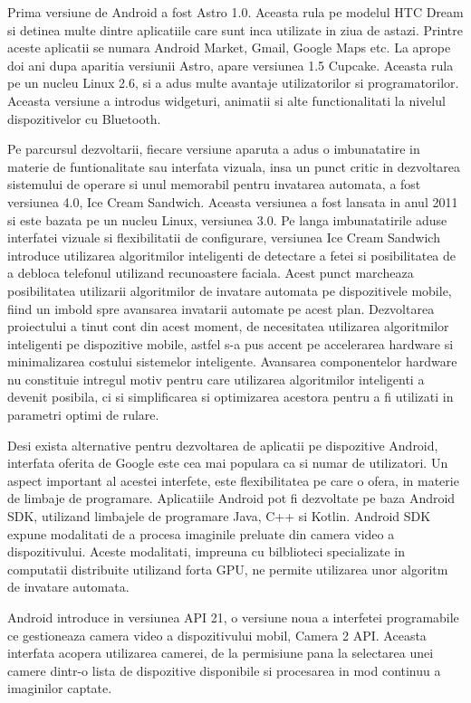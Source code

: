 	Prima versiune de Android a fost Astro 1.0. Aceasta rula pe modelul HTC Dream si detinea multe dintre aplicatiile care sunt inca utilizate in ziua de astazi. Printre aceste aplicatii se numara Android Market, Gmail, Google Maps etc.
	La aprope doi ani dupa aparitia versiunii Astro, apare versiunea 1.5 Cupcake. Aceasta rula pe un nucleu Linux 2.6, si a adus multe avantaje utilizatorilor si programatorilor. Aceasta versiune a introdus widgeturi, animatii si alte functionalitati la nivelul dispozitivelor cu Bluetooth.
	\newline
	
	Pe parcursul dezvoltarii, fiecare versiune aparuta a adus o imbunatatire in materie de funtionalitate sau interfata vizuala, insa un punct critic in dezvoltarea sistemului de operare si unul memorabil pentru invatarea automata, a fost versiunea 4.0, Ice Cream Sandwich. Aceasta versiunea a fost lansata in anul 2011 si este bazata pe un nucleu Linux, versiunea 3.0. Pe langa imbunatatirile aduse interfatei vizuale si flexibilitatii de configurare, versiunea Ice Cream Sandwich introduce utilizarea algoritmilor inteligenti de detectare a fetei si posibilitatea de a debloca telefonul utilizand recunoastere faciala. 	
	Acest punct marcheaza posibilitatea utilizarii algoritmilor de invatare automata pe dispozitivele mobile, fiind un imbold spre avansarea invatarii automate pe acest plan. Dezvoltarea proiectului a tinut cont din acest moment, de necesitatea utilizarea algoritmilor inteligenti pe dispozitive mobile, astfel s-a pus accent pe accelerarea hardware si minimalizarea costului sistemelor inteligente. Avansarea componentelor hardware nu constituie intregul motiv pentru care utilizarea algoritmilor inteligenti a devenit posibila, ci si simplificarea si optimizarea acestora pentru a fi utilizati in parametri optimi de rulare.
	\newline
	
	Desi exista alternative pentru dezvoltarea de aplicatii pe dispozitive Android, interfata oferita de Google este cea mai populara ca si numar de utilizatori. Un aspect important al acestei interfete, este flexibilitatea pe care o ofera, in materie de limbaje de programare. Aplicatiile Android pot fi dezvoltate pe baza Android SDK, utilizand limbajele de programare Java, C++ si Kotlin. \cite{android}	
	Android SDK expune modalitati de a procesa imaginile preluate din camera video a dispozitivului. Aceste modalitati, impreuna cu bilblioteci specializate in computatii distribuite utilizand forta GPU, ne permite utilizarea unor algoritm de invatare automata. 
	
	Android introduce in versiunea API 21, o versiune noua a interfetei programabile ce gestioneaza camera video a dispozitivului mobil, Camera 2 API. Aceasta interfata acopera utilizarea camerei, de la permisiune pana la selectarea unei camere dintr-o lista de dispozitive disponibile si procesarea in mod continuu a imaginilor captate.
	
	

